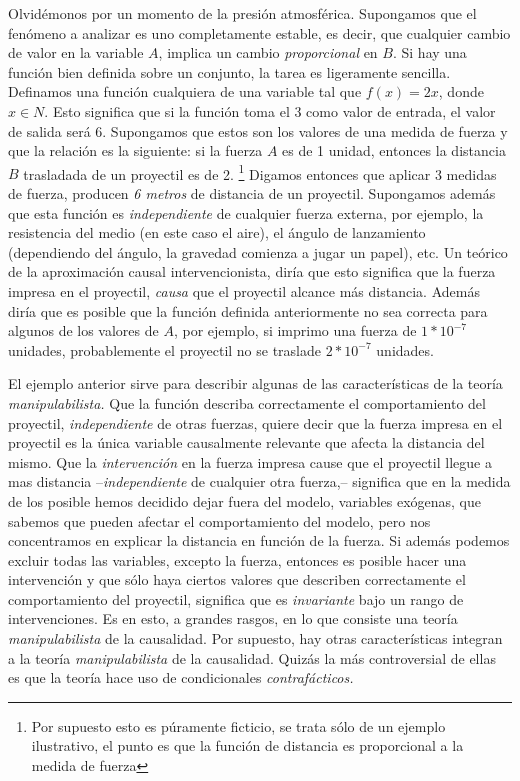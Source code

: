 Olvidémonos por un momento de la presión atmosférica. Supongamos que
el fenómeno a analizar es uno completamente estable, es decir, que
cualquier cambio de valor en la variable $A$, implica un cambio
\emph{proporcional} en $B$. Si hay una función bien definida sobre un
conjunto, la tarea es ligeramente sencilla. Definamos una función
cualquiera de una variable tal que $f(x) = 2x$, donde $x \in {N}$.
Esto significa que si la función toma el $3$ como valor de entrada,
el valor de salida será $6$. Supongamos que estos son los valores de
una medida de fuerza y que la relación es la siguiente: si la fuerza
$A$ es de 1 unidad, entonces la distancia $B$ trasladada de un
proyectil es de 2. \footnote{ Por supuesto esto es púramente
 ficticio, se trata sólo de un ejemplo ilustrativo, el punto es que la
 función de distancia es proporcional a la medida de fuerza } Digamos
entonces que aplicar 3 medidas de fuerza, producen \emph{6 metros} de
distancia de un proyectil. Supongamos además que esta función es
\emph{independiente} de cualquier fuerza externa, por ejemplo, la
resistencia del medio (en este caso el aire), el ángulo de
lanzamiento (dependiendo del ángulo, la gravedad comienza a jugar un
papel), etc. Un teórico de la aproximación causal intervencionista,
diría que esto significa que la fuerza impresa en el proyectil,
\emph{causa} que el proyectil alcance más distancia. Además diría que
es posible que la función definida anteriormente no sea correcta para
algunos de los valores de $A$, por ejemplo, si imprimo una fuerza de
$1*10^{-7}$ unidades, probablemente el proyectil no se traslade
$2*10^{-7}$ unidades.

El ejemplo anterior sirve para describir algunas de las
características de la teoría \emph{manipulabilista. } Que la función
describa correctamente el comportamiento del proyectil,
\emph{independiente} de otras fuerzas, quiere decir que la fuerza
impresa en el proyectil es la única variable causalmente relevante
que afecta la distancia del mismo. Que la \emph {intervención} en la
fuerza impresa cause que el proyectil llegue a mas distancia
--\emph{independiente} de cualquier otra fuerza,-- significa que en
la medida de los posible hemos decidido dejar fuera del modelo,
variables exógenas, que sabemos que pueden afectar el comportamiento
del modelo, pero nos concentramos en explicar la distancia en función
de la fuerza. Si además podemos excluir todas las variables, excepto
la fuerza, entonces es posible hacer una intervención
 y que sólo haya ciertos valores que describen
correctamente el comportamiento del proyectil, significa que es
\emph{invariante} bajo un rango de intervenciones. Es en esto, a
grandes rasgos, en lo que consiste una teoría \emph{manipulabilista}
de la causalidad. Por supuesto, hay otras características integran a
la teoría \emph {manipulabilista} de la causalidad. Quizás la más
controversial de ellas es que la teoría hace uso de condicionales
\emph{contrafácticos. }

